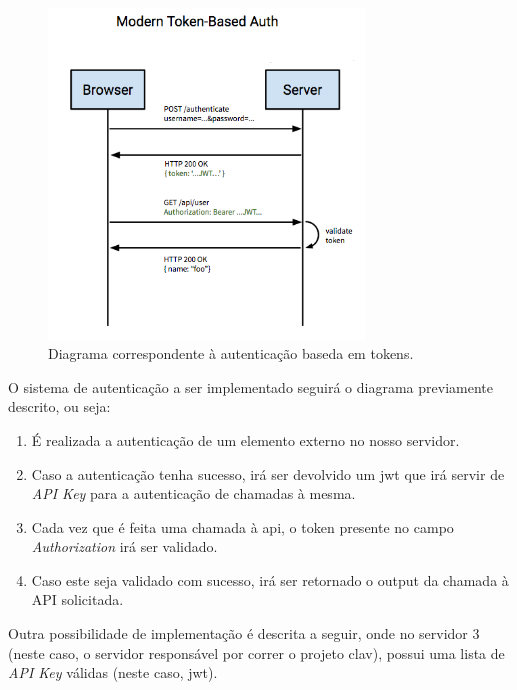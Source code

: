 \begin{figure}[h]
    \centering
    \includegraphics[width=0.75\textwidth]{img/jwt/diagramafluxoJWT.png}
    \caption{Diagrama correspondente à autenticação baseda em tokens. \cite{jwtDiagram}}
\end{figure}

O sistema de autenticação a ser implementado seguirá o diagrama previamente descrito, ou seja:

\begin{enumerate}
    \item É realizada a autenticação de um elemento externo no nosso servidor.
    \item Caso a autenticação tenha sucesso, irá ser devolvido um \gls{jwt} que irá servir de \emph{API Key} para a autenticação de chamadas à mesma.
    \item Cada vez que é feita uma chamada à \gls{api}, o token presente no campo \emph{Authorization} irá ser validado.
    \item Caso este seja validado com sucesso, irá ser retornado o output da chamada à API solicitada.
\end{enumerate}

Outra possibilidade de implementação é descrita a seguir, onde no servidor 3 (neste caso, o servidor responsável por correr o projeto \gls{clav}), possui uma lista de \emph{API Key} válidas (neste caso, \gls{jwt}).

